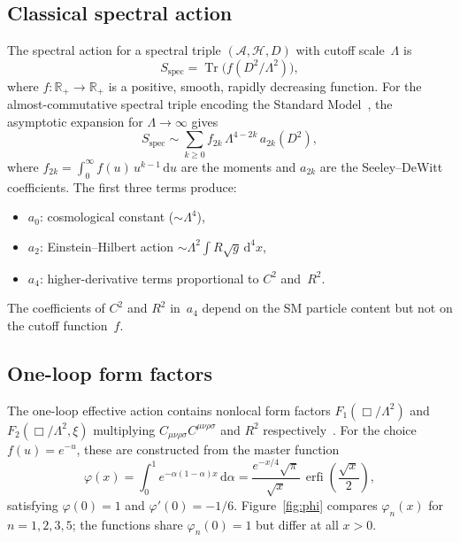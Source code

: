 \documentclass[12pt,a4paper]{article}
\theoremstyle{plain}
\theoremstyle{definition}
\theoremstyle{remark}
\newcommand{\dd}{\mathrm{d}}
\newcommand{\Tr}{\operatorname{Tr}}
\newcommand{\erfi}{\operatorname{erfi}}
\begin{document}
\subsection{Classical spectral action}
\label{sec:classical}

The spectral action for a spectral triple $(\mathcal{A},
\mathcal{H}, D)$ with cutoff scale~$\Lambda$
is~\cite{CC:1996,CC:1997}
\begin{equation}\label{eq:spec-action}
  S_{\mathrm{spec}} = \Tr\bigl(f(D^2/\Lambda^2)\bigr),
\end{equation}
where $f \colon \mathbb{R}_+ \to \mathbb{R}_+$ is a positive,
smooth, rapidly decreasing function.  For the
almost-commutative spectral triple encoding the Standard
Model~\cite{CCM:2006}, the asymptotic expansion for
$\Lambda \to \infty$ gives~\cite{Vassilevich:2003}
\begin{equation}\label{eq:heat-expansion}
  S_{\mathrm{spec}} \sim \sum_{k \geq 0}
  f_{2k}\, \Lambda^{4-2k}\, a_{2k}(D^2),
\end{equation}
where $f_{2k} = \int_0^\infty f(u)\, u^{k-1}\, \dd u$ are the
moments and $a_{2k}$ are the Seeley--DeWitt coefficients.  The
first three terms produce:
\begin{itemize}
  \item $a_0$: cosmological constant ($\sim \Lambda^4$),
  \item $a_2$: Einstein--Hilbert action
    $\sim \Lambda^2 \int R \sqrt{g}\, \dd^4 x$,
  \item $a_4$: higher-derivative terms proportional to $C^2$
    and~$R^2$.
\end{itemize}
The coefficients of $C^2$ and $R^2$ in~$a_4$ depend on the SM
particle content but not on the cutoff function~$f$.

\subsection{One-loop form factors}
\label{sec:formfactors}

The one-loop effective action contains nonlocal form factors
$F_1(\Box/\Lambda^2)$ and $F_2(\Box/\Lambda^2, \xi)$ multiplying
$C_{\mu\nu\rho\sigma}C^{\mu\nu\rho\sigma}$ and $R^2$
respectively~\cite{BV:1987,BV:1990}.  For the choice
$f(u) = e^{-u}$, these are constructed from the master function
\begin{equation}\label{eq:master}
  \varphi(x) = \int_0^1 e^{-\alpha(1-\alpha)x}\, \dd\alpha
  = \frac{e^{-x/4}\sqrt{\pi}}{\sqrt{x}}\,
  \erfi\!\left(\frac{\sqrt{x}}{2}\right),
\end{equation}
satisfying $\varphi(0) = 1$ and $\varphi'(0) = -1/6$.
Figure~\ref{fig:phi} compares $\varphi_n(x)$ for
$n = 1, 2, 3, 5$; the functions share $\varphi_n(0) = 1$ but
differ at all $x > 0$.
\end{document}
